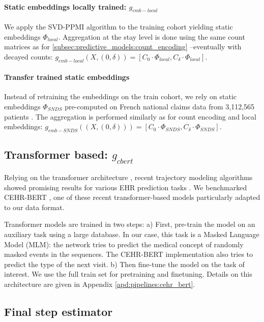 \documentclass[french,12pt,twoside,a4paper]{book}
\begin{document}
\paragraph{Static embeddings locally trained: $g_{emb-local}$} We apply the
SVD-PPMI algorithm to the training cohort yielding static embeddings
$\Phi_{local}$. Aggregation at the stay level is done using the same
count matrices as for \ref{subsec:predictive_models:count_encoding} --eventually
with decayed counts: $g_{emb-local}(X, (0, \delta))=[C_{0} \cdot \Phi_{local}, C_{\delta} \cdot \Phi_{local}]$.

\paragraph{Transfer trained static embeddings} Instead of retraining the
embeddings on the train cohort, we rely on static embeddings $\Phi_{SNDS}$
pre-computed on French national claims data from 3,112,565 patients
\citep{doutrelignerepresentations}. The aggregation is performed similarly as
for count encoding and local embeddings: $g_{emb-SNDS}((X, (0, \delta))) = [C_{0} \cdot \Phi_{SNDS}, C_{\delta} \cdot
  \Phi_{SNDS}]$.

\subsection{Transformer based: $g_{cbert}$}%
\label{subsec:predictive_models:transformer}%

Relying on the transformer architecture \citep{vaswani2017attention}, recent
trajectory modeling algorithms showed promising results for various EHR
prediction tasks \citep{li2020behrt, rasmy2021med,pang2021cehr}. We benchmarked CEHR-BERT
\citep{pang2021cehr}, one of these recent transformer-based models particularly
adapted to our data format.

Transformer models are trained in two steps: a) First, pre-train the model on an
auxiliary task using a large database. In our case, this task is a Masked Language
Model (MLM): the network tries to predict the medical concept of randomly masked
events in the sequences. The CEHR-BERT implementation also tries to predict the
type of the next visit. b) Then fine-tune the model on the task of interest. We
use the full train set for pretraining and finetuning. Details on this
architecture are given in Appendix \ref{apd:pipelines:cehr_bert}.


\subsection{Final step estimator}\label{subsec:predictive_models:estimators}
\end{document}
